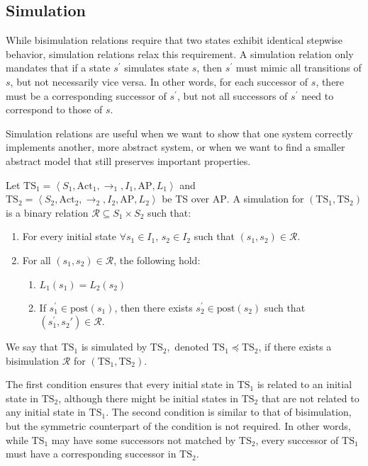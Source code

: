 \subsection{Simulation}
While bisimulation relations require that two states exhibit identical stepwise behavior, simulation relations relax this requirement. 
A simulation relation only mandates that if a state $s^\prime$ simulates state $s$, then $s^\prime$ must mimic all transitions of $s$, but not necessarily vice versa. 
In other words, for each successor of $s$, there must be a corresponding successor of $s^\prime$, but not all successors of $s^\prime$ need to correspond to those of $s$.

Simulation relations are useful when we want to show that one system correctly implements another, more abstract system, or when we want to find a smaller abstract model that still preserves important properties.

\begin{definition}
    Let $\text{TS}_1=\left\langle S_1,\text{Act}_1,\rightarrow_1,I_1,\text{AP},L_1\right\rangle$ and \\ $\text{TS}_2=\left\langle S_2,\text{Act}_2,\rightarrow_2,I_2,\text{AP},L_2\right\rangle$ be TS over $\text{AP}$. 
    A simulation for $(\text{TS}_1,\text{TS}_2)$ is a binary relation $\mathcal{R}\subseteq S_1\times S_2$ such that: 
    \begin{enumerate}
        \item For every initial state $\forall s_1\in I_1$, $s_2\in I_2$ such that $(s_1,s_2)\in \mathcal{R}$. 
        \item For all $(s_1,s_2)\in \mathcal{R}$, the following hold:
            \begin{enumerate}
                \item $L_1(s_1)=L_2(s_2)$
                \item If $s_1^\prime\in\text{post}(s_1)$, then there exists $s_2^\prime\in\text{post}(s_2)$ such that $(s_1^\prime,s_2\prime)\in\mathcal{R}$. 
            \end{enumerate}
    \end{enumerate}
    We say that $\text{TS}_1$ is simulated by $\text{TS}_2,$ denoted $\text{TS}_1 \preceq \text{TS}_2$, if there exists a bisimulation $\mathcal{R}$ for $(\text{TS}_1,\text{TS}_2)$. 
\end{definition}
\noindent The first condition ensures that every initial state in $\text{TS}_1$ is related to an initial state in $\text{TS}_2$, although there might be initial states in $\text{TS}_2$ that are not related to any initial state in $\text{TS}_1$. 
The second condition is similar to that of bisimulation, but the symmetric counterpart of the condition is not required.
In other words, while $\text{TS}_1$ may have some successors not matched by $\text{TS}_2$, every successor of $\text{TS}_1$ must have a corresponding successor in $\text{TS}_2$.

